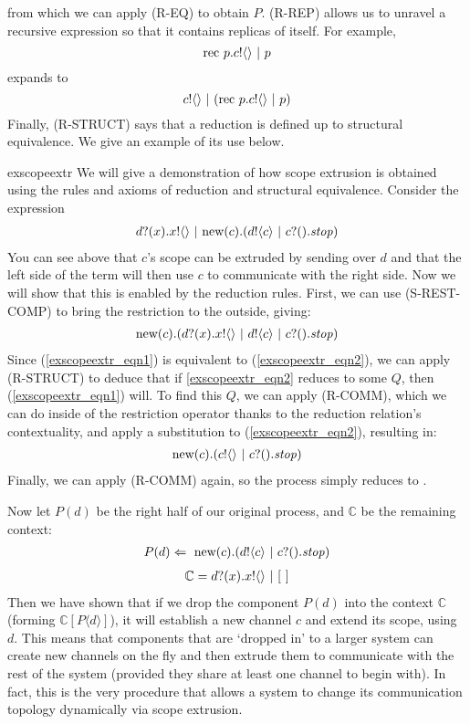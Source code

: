 from which we can apply (R-EQ) to obtain $P$.
(R-REP) allows us to unravel a recursive expression so that it contains replicas of itself.  
For example,
\[
	\text{rec }{p}. {c}!\langle{}\rangle \ |\  p
\]
expands to
\[
	{c}!\langle{}\rangle \ |\  (\text{rec }{p}. {c}!\langle{}\rangle \ |\  p)
\]
Finally, (R-STRUCT) says that a reduction is defined up to structural equivalence.  
We give an example of its use below.
\begin{example}{exscopeextr}
	We will give a demonstration of how scope extrusion is obtained using the rules and axioms of reduction and structural equivalence.  
Consider the expression 
\begin{align}\label{exscopeextr_eqn1}
	{d}?({x}).{x}!\langle{}\rangle\ |\  \text{new}({c}).({d}!\langle{c}\rangle \ |\  {c}?({}).\mbox{\emph{stop}})	
\end{align}
You can see above that $c$'s scope can be extruded by sending over $d$ and that the left side of the term will then use $c$ to communicate with the right side.  
Now we will show that this is enabled by the reduction rules.  
First, we can use (S-REST-COMP) to bring the restriction to the outside, giving:
\begin{align}\label{exscopeextr_eqn2}
	\text{new}({c}).({d}?({x}).{x}!\langle{}\rangle\ |\  {d}!\langle{c}\rangle \ |\  {c}?({}).\mbox{\emph{stop}})		
\end{align}
	Since (\ref{exscopeextr_eqn1}) is equivalent to (\ref{exscopeextr_eqn2}), we can apply (R-STRUCT) to deduce that if \ref{exscopeextr_eqn2} reduces to some $Q$, then (\ref{exscopeextr_eqn1}) will.
	To find this $Q$, we can apply (R-COMM), which we can do inside of the restriction operator thanks to the reduction relation's contextuality, and apply a substitution to (\ref{exscopeextr_eqn2}), resulting in:
\begin{align}
	\text{new}({c}).({c}!\langle{}\rangle \ |\  {c}?({}).\mbox{\emph{stop}})
\end{align}
	Finally, we can apply (R-COMM) again, so the process simply reduces to \pstop.  


	Now let $P(d)$ be the right half of our original process, and $\mathbb{C}$ be the remaining context:
	\begin{align}
		P(d) \Leftarrow\  \text{new}({c}).({d}!\langle{c}\rangle \ |\  {c}?({}).\mbox{\emph{stop}})
	\end{align}
	\begin{align}
		\mathbb{C} = {d}?({x}).{x}!\langle{}\rangle \ |\  [\ ]
	\end{align}
Then we have shown that if we drop the component $P(d)$ into the context $\mathbb{C}$ (forming $\mathbb{C}[P\langle d \rangle]$), it will establish a new channel $c$ and extend its scope, using $d$.
This means that components that are `dropped in' to a larger system can create new channels on the fly and then extrude them to communicate with the rest of the system (provided they share at least one channel to begin with).  
In fact, this is the very procedure that allows a system to change its communication topology dynamically via scope extrusion.
\end{example}

